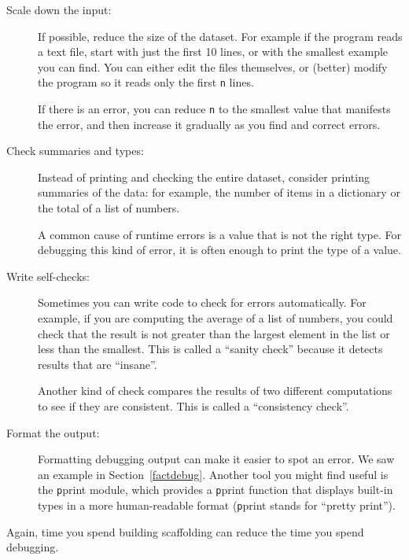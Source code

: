 \documentclass[
DIV=11,
fontsize=12,
twoside,
headinclude=false,
titlepage=firstiscover,
abstract=true,
headsepline=true,
footsepline=true,
chapterprefix=true, %
headings=big,
bibliography=totoc,%
captions=tableheading
]{scrbook}
\theoremstyle{definition}
\begin{document}
\begin{description}

\item[Scale down the input:] If possible, reduce the size of the
dataset.  For example if the program reads a text file, start with
just the first 10 lines, or with the smallest example you can find.
You can either edit the files themselves, or (better) modify the
program so it reads only the first {\texttt n} lines.

If there is an error, you can reduce {\texttt n} to the smallest
value that manifests the error, and then increase it gradually
as you find and correct errors.

\item[Check summaries and types:] Instead of printing and checking the
entire dataset, consider printing summaries of the data: for example,
the number of items in a dictionary or the total of a list of numbers.

A common cause of runtime errors is a value that is not the right
type.  For debugging this kind of error, it is often enough to print
the type of a value.

\item[Write self-checks:]  Sometimes you can write code to check
for errors automatically.  For example, if you are computing the
average of a list of numbers, you could check that the result is
not greater than the largest element in the list or less than
the smallest.  This is called a ``sanity check'' because it detects
results that are ``insane''.

Another kind of check compares the results of two different
computations to see if they are consistent.  This is called a
``consistency check''.

\item[Format the output:] Formatting debugging output
can make it easier to spot an error.  We saw an example in
Section~\ref{factdebug}.  Another tool you might find useful is the {\texttt pprint} module, which provides
a {\texttt pprint} function that displays built-in types in
a more human-readable format ({\texttt pprint} stands for
``pretty print'').

\end{description}

Again, time you spend building scaffolding can reduce
the time you spend debugging.
\end{document}
